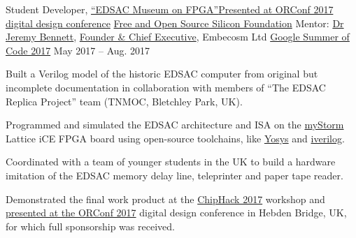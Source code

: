 \begin{cvexperience}
\cvposition
	{Student Developer, \href{https://github.com/librecores/gsoc-museum-edsac}{``EDSAC Museum on FPGA''}\quad\textbar\quad \href{https://orconf.org/2017/\#edsac}{Presented at ORConf 2017 digital design conference}} %
	{\href{https://fossi-foundation.org}{Free and Open Source Silicon Foundation}} %
	{Mentor: \href{http://www.jeremybennett.com}{Dr Jeremy Bennett}, \href{https://www.embecosm.com/about/meet-the-team/jeremy-bennett/}{Founder \& Chief Executive}, Embecosm Ltd} %
	{\href{https://summerofcode.withgoogle.com/archive/2017/projects/6470218444439552/}{Google Summer of Code 2017}} %
	{May 2017 -- Aug. 2017} %
	{\begin{cvitems} %
		\item {Built a Verilog model of the historic EDSAC computer from original but incomplete documentation in collaboration with members of ``The EDSAC Replica Project'' team (TNMOC, Bletchley Park, UK).}
		\item {Programmed and simulated the EDSAC architecture and ISA on the \href{https://mystorm.uk/}{myStorm} Lattice iCE FPGA board using open-source toolchains, like \href{http://www.clifford.at/yosys/}{Yosys} and \href{http://iverilog.icarus.com}{iverilog}.}
		\item {Coordinated with a team of younger students in the UK to build a hardware imitation of the EDSAC memory delay line, teleprinter and paper tape reader.}
		\item {Demonstrated the final work product at the \href{http://chiphack.org/chiphack-2017.html}{ChipHack 2017} workshop and \href{https://youtu.be/EZkJOyOcYiY}{presented at the ORConf 2017} digital design conference in Hebden Bridge, UK, for which full sponsorship was received.}
	\end{cvitems}}


\end{cvexperience}

